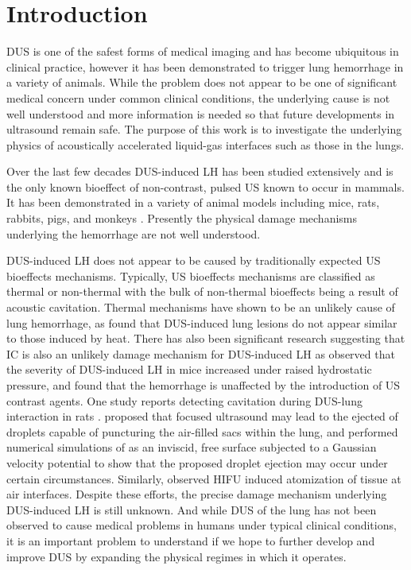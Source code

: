 \section{Introduction}%
\label{sec:introduction}%
%
\ac{DUS} is one of the safest forms of medical imaging and has become
ubiquitous in clinical practice, however it has been demonstrated to
trigger lung hemorrhage in a variety of animals. While the problem
does not appear to be one of significant medical concern under common
clinical conditions, the underlying cause is not well understood and
more information is needed so that future developments in ultrasound
remain safe. The purpose of this work is to investigate the underlying
physics of acoustically accelerated liquid-gas interfaces such as
those in the lungs. 

%
Over the last few decades \ac{DUS}-induced \ac{LH} has been
studied extensively and is the only known bioeffect of non-contrast,
pulsed \ac{US} known to occur in mammals. It has been demonstrated in
a variety of animal models including mice, rats, rabbits, pigs, and
monkeys \citep{Child1990,OBrien2006a,Tarantal1994a}. Presently the
physical damage mechanisms underlying the hemorrhage are not well
understood.

\ac{DUS}-induced \ac{LH} does not appear to be caused by traditionally
expected \ac{US} bioeffects mechanisms. Typically, \ac{US} bioeffects
mechanisms are classified as thermal or non-thermal with the bulk of
non-thermal bioeffects being a result of acoustic cavitation. Thermal
mechanisms have shown to be an unlikely cause of lung hemorrhage, as
\cite{Zachary2006} found that \ac{DUS}-induced lung lesions do not
appear similar to those induced by heat. There has also been
significant research suggesting that \ac{IC} is also an unlikely
damage mechanism for \ac{DUS}-induced \ac{LH} as \cite{OBrien2000}
observed that the severity of \ac{DUS}-induced \ac{LH} in mice
increased under raised hydrostatic pressure, and \cite{Raeman1996}
found that the hemorrhage is unaffected by the introduction of \ac{US}
contrast agents. One study reports detecting cavitation during
\ac{DUS}-lung interaction in rats \cite{Holland1996}. \cite{Tjan2007}
proposed that focused ultrasound may lead to the ejected of droplets
capable of puncturing the air-filled sacs within the lung, and
performed numerical simulations of as an inviscid, free surface
subjected to a Gaussian velocity potential to show that the proposed
droplet ejection may occur under certain circumstances. Similarly,
\cite{Simon2012} observed \ac{HIFU} induced atomization of tissue at
air interfaces. Despite these efforts, the precise damage mechanism
underlying \ac{DUS}-induced \ac{LH} is still unknown. And while
\ac{DUS} of the lung has not been observed to cause medical problems
in humans under typical clinical conditions, it is an important
problem to understand if we hope to further develop and improve
\ac{DUS} by expanding the physical regimes in which it operates.


